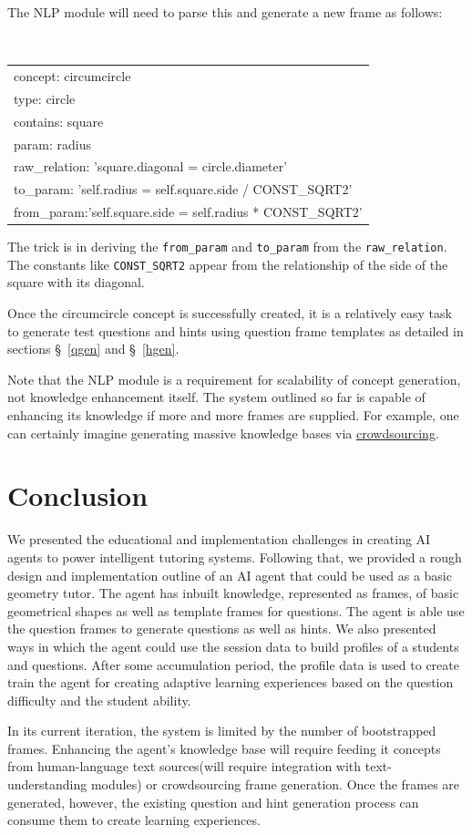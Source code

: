 \documentclass[10pt,letterpaper]{article}
\begin{document}
The NLP module will need to parse this and generate a new frame as follows:

\begin{center}
    {\tt
        \begin{tabular}{ |l|  }
          \hline
          concept: circumcircle\\
          type: circle\\
          contains: square\\
          param: radius\\
	 raw\_relation: 'square.diagonal = circle.diameter'\\          
	 to\_param: 'self.radius = self.square.side / CONST\_SQRT2'\\
	 from\_param:'self.square.side = self.radius * CONST\_SQRT2' \\
          \hline  
        \end{tabular}
    }
\end{center}

The trick is in deriving the {\tt from\_param} and {\tt to\_param} from the {\tt raw\_relation}. The constants like {\tt CONST\_SQRT2} appear from the relationship of the side of the square with its diagonal.

Once the circumcircle concept is successfully created, it is a relatively easy task to generate test questions and hints using question frame templates as detailed in sections \S~\ref{qgen} and \S~\ref{hgen}.

Note that the NLP module is a requirement for scalability of concept generation, not knowledge enhancement itself. The system outlined so far is capable of enhancing its knowledge if more and more frames are supplied. For example, one can certainly imagine generating massive knowledge bases via \href{https://en.wikipedia.org/wiki/Crowdsourcing}{crowdsourcing}. 

\section*{Conclusion}
We presented the educational and implementation challenges in creating AI agents to power intelligent tutoring systems. Following that, we provided a rough design and implementation outline of an AI agent that could be used as a basic geometry tutor. The agent has inbuilt knowledge, represented as frames, of basic geometrical shapes as well as template frames for questions. The agent is able use the question frames to generate questions as well as hints. We also presented ways in which the agent could use the session data to build profiles of a students and questions. After some accumulation period, the profile data is used to create  train the agent for creating adaptive learning experiences based on the question difficulty and the student ability.

In its current iteration, the system is limited by the number of bootstrapped frames. Enhancing the agent's knowledge base will require feeding it concepts from human-language text sources(will require integration with text-understanding modules) or crowdsourcing frame generation. Once the frames are generated, however, the existing question and hint generation process can consume them to create learning experiences. 
\end{document}
